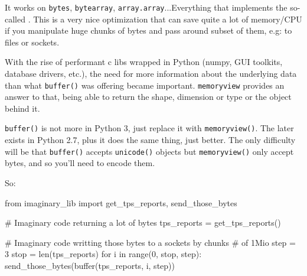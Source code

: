 It works on \lstinline{bytes}, \lstinline{bytearray}, \lstinline{array.array}...Everything that implements the so-called . This is a very nice optimization that can save quite a lot of memory/CPU if you manipulate huge chunks of bytes and pass around subset of them, e.g: to files or sockets.

With the rise of performant c libs wrapped in Python (numpy, GUI toolkits, database drivers, etc.), the need for more information about the underlying data than what \lstinline{buffer()} was offering became important. \lstinline{memoryview} provides an answer to that, being able to return the shape, dimension or type or the object behind it.

\lstinline{buffer()} is not more in Python 3, just replace it with \lstinline{memoryview()}. The later exists in Python 2.7, plus it does the same thing, just better. The only difficulty will be that \lstinline{buffer()} accepts \lstinline{unicode()} objects but \lstinline{memoryview()} only accept bytes, and so you'll need to encode them.

So:

\begin{py2}
from imaginary_lib import get_tps_reports, send_those_bytes

# Imaginary code returning a lot of bytes
tps_reports = get_tps_reports()

# Imaginary code writting those bytes to a sockets by chunks
# of 1Mio
step = 3
stop = len(tps_reports)
for i in range(0, stop, step):
    send_those_bytes(buffer(tps_reports, i, step))

\end{py2}
